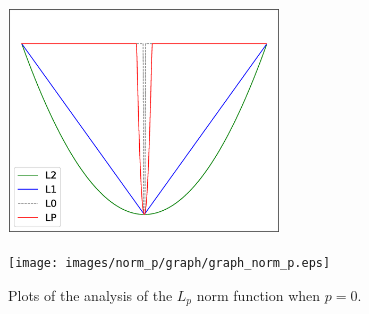 \begin{figure}[tb]
\vspace{-15pt}
	\begin{minipage}[b]{0.49\hsize}
		\centering
		\includegraphics[width=72mm, height = 60mm]{images/norm_p/graph/graph_norm.eps}
		 \label{fig:nom_p/comparison}
	\end{minipage}
	\begin{minipage}[b]{0.49\hsize}
		\centering
		\texttt{[image: images/norm\_p/graph/graph\_norm\_p.eps]}
		 \label{fig:nom_p/graph_norm_p}
	\end{minipage}
	\caption{Plots of the analysis of the $L_{p}$ norm function when $p=0$.}
	\label{fig:graph_lp}
\end{figure}

